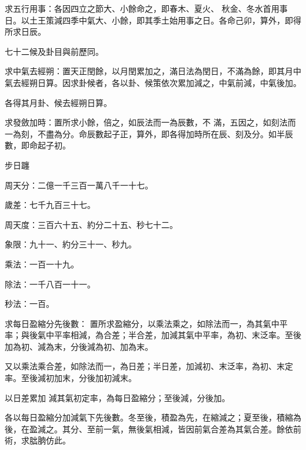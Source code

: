 \begin{pinyinscope}
 求五行用事：各因四立之節大、小餘命之，即春木、夏火、
 秋金、冬水首用事日。以土王策減四季中氣大、小餘，即其季土始用事之日。各命己卯，算外，即得所求日辰。



 七十二候及卦目與前歷同。



 求中氣去經朔：置天正閏餘，以月閏累加之，滿日法為閏日，不滿為餘，即其月中氣去經朔日算。因求卦候者，各以卦、候策依次累加減之，中氣前減，中氣後加。



 各得其月卦、候去經朔日算。



 求發斂加時：置所求小餘，倍之，如辰法而一為辰數，不
 滿，五因之，如刻法而一為刻，不盡為分。命辰數起子正，算外，即各得加時所在辰、刻及分。如半辰數，即命起子初。



 步日躔



 周天分：二億一千三百一萬八千一十七。



 歲差：七千九百三十七。



 周天度：三百六十五、約分二十五、秒七十二。



 象限：九十一、約分三十一、秒九。



 乘法：一百一十九。



 除法：一千八百一十一。



 秒法：一百。



 求每日盈縮分先後數：
 置所求盈縮分，以乘法乘之，如除法而一，為其氣中平率；與後氣中平率相減，為合差；半合差，加減其氣中平率，為初、末泛率。至後加為初、減為末，分後減為初、加為末。



 又以乘法乘合差，如除法而一，為日差；半日差，加減初、末泛率，為初、末定率。至後減初加末，分後加初減末。



 以日差累加
 減其氣初定率，為每日盈縮分；至後減，分後加。



 各以每日盈縮分加減氣下先後數。冬至後，積盈為先，在縮減之；夏至後，積縮為後，在盈減之。其分、至前一氣，無後氣相減，皆因前氣合差為其氣合差。餘依前術，求朏朒仿此。




\end{pinyinscope}
